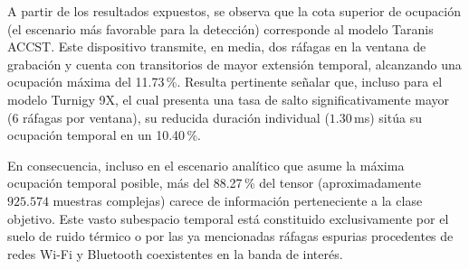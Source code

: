 \begin{table}[htbp]
\centering
\small
\caption{Ciclo de trabajo empírico y ocupación temporal máxima por modelo en una ventana de observación de 75\,ms.}
\label{tab:ocupacion_temporal}
\end{table}

A partir de los resultados expuestos, se observa que la cota superior de ocupación (el escenario más favorable para la detección) corresponde al modelo Taranis ACCST. Este dispositivo transmite, en media, dos ráfagas en la ventana de grabación y cuenta con transitorios de mayor extensión temporal, alcanzando una ocupación máxima del 11.73\,\%. Resulta pertinente señalar que, incluso para el modelo Turnigy 9X, el cual presenta una tasa de salto significativamente mayor (6 ráfagas por ventana), su reducida duración individual ($1.30$\,ms) sitúa su ocupación temporal en un 10.40\,\%.

En consecuencia, incluso en el escenario analítico que asume la máxima ocupación temporal posible, más del 88.27\,\% del tensor (aproximadamente $925.574$ muestras complejas) carece de información perteneciente a la clase objetivo. Este vasto subespacio temporal está constituido exclusivamente por el suelo de ruido térmico o por las ya mencionadas ráfagas espurias procedentes de redes Wi-Fi y Bluetooth coexistentes en la banda de interés.

